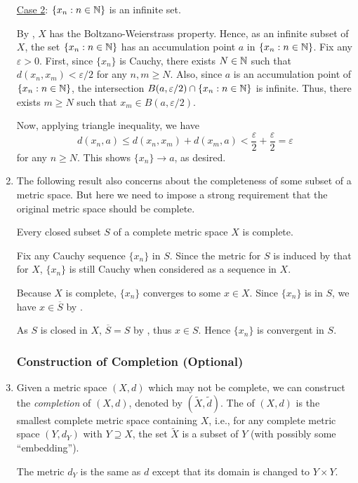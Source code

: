 \begin{enumerate}
\begin{pf}
\underline{Case 2}: \(\{x_n:n\in\mathbb{N}\}\) is an infinite set.

By , \(X\) has the Boltzano-Weierstrass property. Hence,
as an infinite subset of \(X\), the set \(\{x_n:n\in\mathbb{N}\}\) has an accumulation
point \(a\) in \(\{x_n:n\in\mathbb{N}\}\). Fix any \(\varepsilon>0\). First, since
\(\{x_n\}\) is Cauchy, there exists \(N\in\mathbb{N}\) such that
\(d(x_n,x_m)<\varepsilon/2\) for any \(n,m\ge N\). Also, since \(a\) is an
accumulation point of \(\{x_n:n\in\mathbb{N}\}\), the intersection
\(B(a,\varepsilon/2)\cap\{x_n:n\in\mathbb{N}\}\) is infinite. Thus, there exists \(m\ge
N\) such that \(x_m\in B(a,\varepsilon/2)\).

Now, applying triangle inequality, we have
\[
d(x_n,a)\le d(x_n,x_m)+d(x_m,a)<\frac{\varepsilon}{2}+\frac{\varepsilon}{2}=\varepsilon
\]
for any \(n\ge N\). This shows \(\{x_n\}\to a\), as desired.
\end{pf}

\item The following result also concerns about the completeness of some subset
of a metric space. But here we need to impose a strong requirement that the
original metric space should be complete.

\begin{proposition}
\label{prp:cls-subset-cpl-ms-cpl}
Every closed subset \(S\) of a complete metric space \(X\) is complete.
\end{proposition}
\begin{pf}
Fix any Cauchy sequence \(\{x_n\}\) in \(S\). Since the metric for \(S\) is induced by that for \(X\), \(\{x_n\}\) is still Cauchy when considered as a sequence in \(X\).

Because \(X\) is complete, \(\{x_n\}\) converges to
some \(x\in X\). Since \(\{x_n\}\) is in \(S\), we have \(x\in\overline{S}\) by .

As \(S\) is closed in \(X\), \(\overline{S}=S\) by , thus \(x\in S\). Hence \(\{x_n\}\) is convergent in \(S\).
\end{pf}

\subsubsection*{Construction of Completion (Optional)}
\item Given a metric space \((X,d)\) which may not be complete, we can
construct the \emph{completion} of \((X,d)\), denoted by
\((\widetilde{X},\widetilde{d})\). The  of \((X,d)\) is the
smallest complete metric space containing \(X\), i.e., for any complete metric
space \((Y,d_Y)\) with \(Y\supseteq X\), the set \(\widetilde{X}\) is a subset
of \(Y\) (with possibly some ``embedding''). \begin{note}
The metric \(d_Y\) is the same as \(d\) except that its domain is changed to
\(Y\times Y\).
\end{note}


\end{enumerate}
